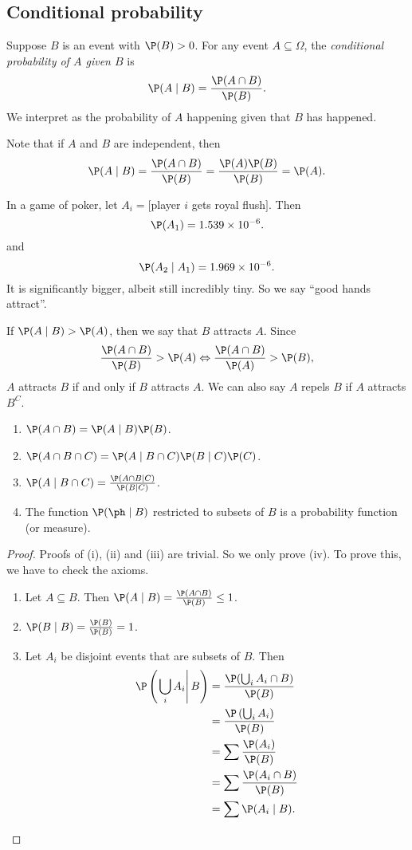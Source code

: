\documentclass[a4paper]{article}
\begin{document}
\subsection{Conditional probability}
\begin{defi}
  Suppose $B$ is an event with $\P(B) > 0$. For any event $A\subseteq \Omega$, the \emph{conditional probability of $A$ given $B$} is
  \[
    \P(A\mid B) = \frac{\P(A\cap B)}{\P(B)}.
  \]
  We interpret as the probability of $A$ happening given that $B$ has happened.
\end{defi}
Note that if $A$ and $B$ are independent, then
\[
  \P(A\mid B) = \frac{\P(A\cap B)}{\P(B)} = \frac{\P(A)\P(B)}{\P(B)} = \P(A).
\]
\begin{eg}
  In a game of poker, let $A_i = [$player $i$ gets royal flush$]$. Then
  \[
    \P(A_1) = 1.539\times 10^{-6}.
  \]
  and
  \[
    \P(A_2\mid A_1) = 1.969\times 10^{-6}.
  \]
  It is significantly bigger, albeit still incredibly tiny. So we say ``good hands attract''.

  If $\P(A\mid B) > \P(A)$, then we say that $B$ attracts $A$. Since
  \[
    \frac{\P(A\cap B)}{\P(B)} > \P(A) \Leftrightarrow \frac{\P(A\cap B)}{\P(A)} > \P(B),
  \]
  $A$ attracts $B$ if and only if $B$ attracts $A$. We can also say $A$ repels $B$ if $A$ attracts $B^C$.
\end{eg}
\begin{thm}\leavevmode
  \begin{enumerate}
    \item $\P(A\cap B) = \P(A\mid B)\P(B)$.
    \item $\P(A\cap B\cap C) = \P(A\mid B\cap C) \P(B\mid C) \P(C)$.
    \item $\P(A\mid B\cap C) = \frac{\P(A\cap B\mid C)}{\P(B\mid C)}$.
    \item The function $\P(\ph \mid B)$ restricted to subsets of $B$ is a probability function (or measure).
  \end{enumerate}
\end{thm}
\begin{proof}
  Proofs of (i), (ii) and (iii) are trivial. So we only prove (iv). To prove this, we have to check the axioms.

  \begin{enumerate}
    \item Let $A\subseteq B$. Then $\P(A\mid B) = \frac{\P(A\cap B)}{\P(B)} \leq 1$.
    \item $\P(B\mid B) = \frac{\P(B)}{\P(B)} = 1$.
    \item Let $A_i$ be disjoint events that are subsets of $B$. Then
      \begin{align*}
        \P\left(\left.\bigcup_i A_i\right\vert B\right) &= \frac{\P(\bigcup_i A_i\cap B)}{\P(B)}\\
        &= \frac{\P\left(\bigcup_i A_i\right)}{\P(B)}\\
        &= \sum \frac{\P(A_i)}{\P(B)}\\
        &=\sum \frac{\P(A_i\cap B)}{\P(B)}\\
        &= \sum \P(A_i \mid B).
      \end{align*}
  \end{enumerate}
\end{proof}
\end{document}
